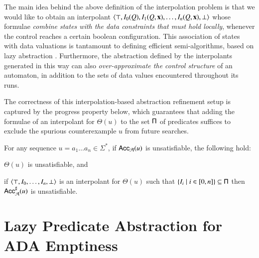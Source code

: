 \documentclass[10pt]{llncs}
\begin{document}
The main idea behind the above definition of the interpolation problem
is that we would like to obtain an interpolant $\left\langle \top,I_0(Q),
  I_1(Q,\mathbf x), \ldots, I_{n}(Q,\mathbf x),\bot \right\rangle$ whose formulae
\emph{combine states with the data constraints that must hold
  locally}, whenever the control reaches a certain boolean
configuration. This association of states with data valuations is
tantamount to defining efficient semi-algorithms, based on lazy
abstraction \cite{HJMS02}. Furthermore, the abstraction defined by the
interpolants generated in this way can also \emph{over-approximate the
  control structure} of an automaton, in addition to the sets of data
values encountered throughout its runs.

The correctness of this interpolation-based abstraction refinement
setup is captured by the progress property below, which guarantees
that adding the formulae of an interpolant for $\Theta(u)$ to the set
$\mathsf{\Pi}$ of predicates suffices to exclude the spurious counterexample
$u$ from future searches.

\begin{lemma}\label{lemma:progress}
  For any sequence $u = a_1\ldots a_n \in \Sigma^*$, if
  $\mathsf{Acc}_{\mathcal{A}}(u)$ is unsatisfiable, the following
  hold: \begin{compactenum}
  \item\label{it1:progress} $\Theta(u)$ is unsatisfiable, and
  \item\label{it2:progress} if $\left\langle \top,I_0,\dots,I_{n},\bot \right\rangle$ is
    an interpolant for $\Theta(u)$ such that $\left\{ I_i \mid i
      \in[0,n] \right\} \subseteq \mathsf{\Pi}$ then ${\mathsf{Acc}}^\sharp_{\mathcal{A}}(u)$ is
    unsatisfiable.
  \end{compactenum}
\end{lemma}

\section{Lazy Predicate Abstraction for ADA Emptiness}
\end{document}
